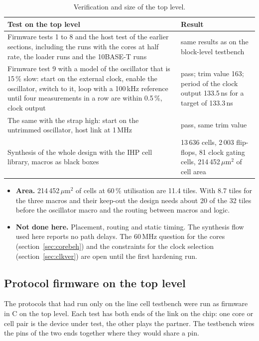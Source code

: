\documentclass[10pt,a4paper]{article}
\begin{document}
\begin{table}[H]
\centering\small
\begin{tabularx}{\linewidth}{@{}LL@{}}
\toprule
Test on the top level & Result \\
\midrule
Firmware tests 1 to 8 and the host test of the earlier sections, including the runs with the cores at half rate, the loader runs and the 10BASE-T runs & same results as on the block-level testbench \\
Firmware test 9 with a model of the oscillator that is 15\,\% slow: start on the external clock, enable the oscillator, switch to it, loop with a 100\,kHz reference until four measurements in a row are within 0.5\,\%, clock output & pass; trim value 163; period of the clock output 133.5\,ns for a target of 133.3\,ns \\
The same with the strap high: start on the untrimmed oscillator, host link at 1\,MHz & pass, same trim value \\
Synthesis of the whole design with the IHP cell library, macros as black boxes & 13\,636 cells, 2\,003 flip-flops, 81 clock gating cells, 214\,452\,$\mu$m$^2$ of cell area \\
\bottomrule
\end{tabularx}
\caption{Verification and size of the top level.}
\end{table}

\begin{itemize}
\item \textbf{Area.} 214\,452\,$\mu$m$^2$ of cells at 60\,\% utilisation are 11.4 tiles. With 8.7 tiles for the three
macros and their keep-out the design needs about 20 of the 32 tiles before the oscillator macro and the
routing between macros and logic.
\item \textbf{Not done here.} Placement, routing and static timing. The synthesis flow used here reports no path
delays. The 60\,MHz question for the cores (section~\ref{sec:corebeh}) and the constraints for the clock
selection (section~\ref{sec:clkver}) are open until the first hardening run.
\end{itemize}

\subsection{Protocol firmware on the top level}\label{sec:protover}

The protocols that had run only on the line cell testbench were run as firmware in C on the top level. Each
test has both ends of the link on the chip: one core or cell pair is the device under test, the other plays the
partner. The testbench wires the pins of the two ends together where they would share a pin.
\end{document}
